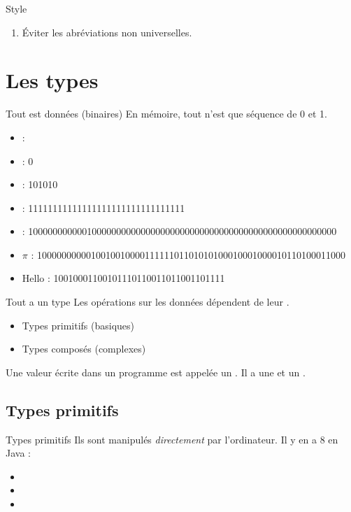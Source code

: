 \begin{hideedit}
\begin{frame}[fragile]{Style}
\begin{enumerate}[<+->]
    \item Éviter les abréviations non universelles.

  \end{enumerate}
\end{frame}

\section{Les types}
\begin{frame}{Tout est données (binaires)}
  En mémoire, tout n'est que séquence de 0 et 1.
  \begin{itemize}
    \item {} : 
    \item {} : 0
    \item {} : 101010
    \item {} : 11111111111111111111111111111111
    \item {} : {\small
      100000000000100000000000000000000000000000000000000000000000000}
    \item \(\pi\) : {\small
      100000000001001001000011111101101010100010001000010110100011000}
    \item \og Hello \fg : 10010001100101110110011011001101111
  \end{itemize}
\end{frame}

\begin{frame}{Tout a un type}
  Les opérations sur les données dépendent de leur .

  \pause
  \begin{itemize}
    \item Types primitifs (basiques)
    \item Types composés (complexes)
  \end{itemize}

  \pause
  \begin{definition}
    Une valeur écrite dans un programme est appelée un
    . Il a une  et un .
  \end{definition}
\end{frame}

\subsection{Types primitifs}
\begin{frame}{Types primitifs}
  Ils sont manipulés \emph{directement} par l'ordinateur. Il y en a 8 en Java :
  \begin{itemize}
    \item {}
    \item {}    
    \item {} 
  \end{itemize}


\end{frame}
\end{hideedit}
